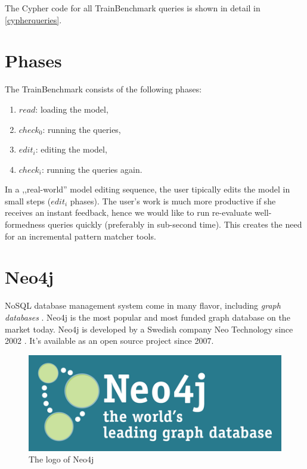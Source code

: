 The Cypher code for all TrainBenchmark queries is shown in detail in \autoref{cypherqueries}.

\section{Phases}

The TrainBenchmark consists of the following phases:

\begin{enumerate}
  \item $read$: loading the model,
  \item $check_0$: running the queries,
  \item $edit_i$: editing the model, 
  \item $check_i$: running the queries again.
\end{enumerate}

In a ,,real-world'' model editing sequence, the user tipically edits the model in small steps ($edit_i$ phases). The user's work is much more productive if she receives an instant feedback, hence we would like to run re-evaluate well-formedness queries quickly (preferably in sub-second time). This creates the need for an incremental pattern matcher tools.

\section{Neo4j}

NoSQL database management system come in many flavor, including \textit{graph databases} \cite{NoSQL}. Neo4j is the most popular and most funded graph database on the market today. Neo4j is developed by a Swedish company Neo Technology since 2002 \cite{neo4j}. It's available as an open source project since 2007.

\begin{figure}
\begin{center}
\includegraphics[]{figures/neo4j-logo}
\caption{The logo of Neo4j}
\label{fig:neo4j-logo}
\end{center}
\end{figure}

